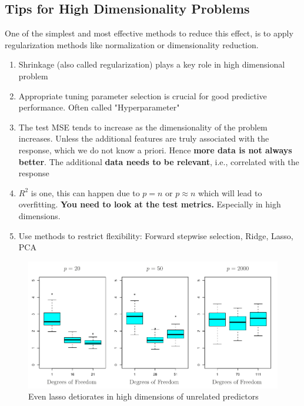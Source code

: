 \documentclass[../Main.tex]{subfiles}
\begin{document}
\subsection{Tips for High Dimensionality Problems}
One of the simplest and most effective methods to reduce this effect,
is to apply regularization methods like normalization or dimensionality reduction.
\begin{enumerate}
    \item Shrinkage (also called regularization) plays 
    a key role in high dimensional problem
    \item Appropriate tuning parameter selection is 
    crucial for good predictive performance. Often called "Hyperparameter"
    \item The test MSE tends to increase as the 
    dimensionality of the problem increases. Unless the additional features are truly 
    associated with the response, which we do 
    not know a priori. Hence \textbf{more data is not always better}. The 
    additional \textbf{data needs to be relevant}, i.e., 
    correlated with the response
    \item \(R^2\) is one, this can happen due to \(p=n\) or \(p \approx n\) which will lead to overfitting.
    \textbf{You need to look at the test metrics.} Especially in high dimensions.
    \item Use methods to restrict flexibility: Forward stepwise selection, Ridge, Lasso, PCA
\end{enumerate}


\begin{figure}[H]
    \centering
    \includegraphics[width=0.75\linewidth]{Images/lasso-fails-high-dim.png}
    \caption{Even lasso detiorates in high dimensions of unrelated predictors}
\end{figure}
\end{document}
